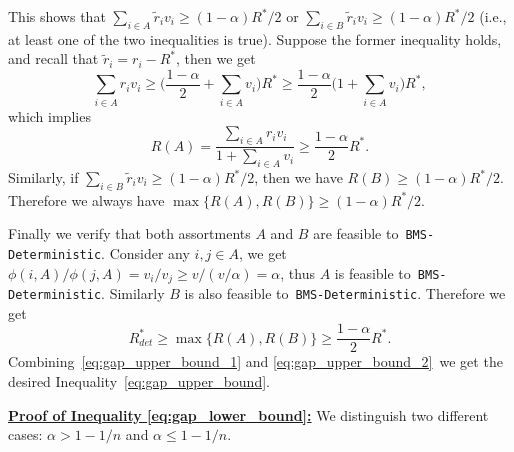 \documentclass[mnsc,non-blindrev]{informs3}
\theoremstyle{definition}
\begin{document}
\begin{appendices}{\Large{}}
\begin{equation*}
\end{equation*}
This shows that $\sum_{i\in A}\tilde{r}_iv_i\geq (1-\alpha)R^*/2$ or $\sum_{i\in B}\tilde{r}_iv_i\geq (1-\alpha)R^*/2$ (i.e., at least one of the two inequalities is true). Suppose the former inequality holds, and recall that $\tilde{r}_i=r_i-R^*$, then we get
\begin{equation*}
\sum_{i\in A}r_iv_i\geq \Big(\dfrac{1-\alpha}{2}+\sum_{i\in A}v_i\Big)R^*\geq \dfrac{1-\alpha}{2}\Big(1+\sum_{i\in A}v_i\Big)R^*,
\end{equation*}
which implies
\begin{equation*}
R(A)=\dfrac{\sum_{i\in A}r_iv_i}{1+\sum_{i\in A}v_i}\geq \dfrac{1-\alpha}{2}R^*.
\end{equation*}
Similarly, if $\sum_{i\in B}\tilde{r}_iv_i\geq (1-\alpha)R^*/2$, then we have $R(B)\geq (1-\alpha)R^*/2$. Therefore we always have $\max\{R(A),R(B)\}\geq (1-\alpha)R^*/2$. 

Finally we verify that both assortments $A$ and $B$ are feasible to~\texttt{BMS-Deterministic}. Consider any $i,j\in A$, we get $\phi(i,A)/\phi(j,A)=v_i/v_j{ \geq} v/(v/\alpha)=\alpha$, thus $A$ is feasible to~\texttt{BMS-Deterministic}. Similarly $B$ is also feasible to~\texttt{BMS-Deterministic}. Therefore we get
\begin{equation}
R^*_{det}\geq \max\{R(A),R(B)\}\geq \dfrac{1-\alpha}{2}R^*.\label{eq:gap_upper_bound_2}
\end{equation}
Combining~\eqref{eq:gap_upper_bound_1} and \eqref{eq:gap_upper_bound_2}~we get the desired Inequality~\eqref{eq:gap_upper_bound}.

\noindent\underline{\bf Proof of Inequality \eqref{eq:gap_lower_bound}:} We distinguish two different cases: $\alpha>1-1/n$ and $\alpha\leq1-1/n$.


\end{appendices}
\end{document}
